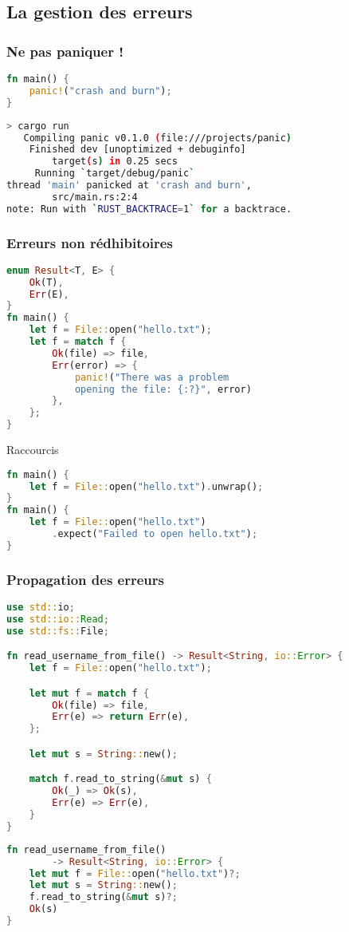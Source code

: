 \subsection{La gestion des erreurs}

\begin{frame}[fragile]
  \frametitle{Ne pas paniquer !}
  \begin{lstlisting}[language=rust]
fn main() {
    panic!("crash and burn");
}
  \end{lstlisting}
  \begin{lstlisting}[language=bash, basicstyle=\small{}]
> cargo run
   Compiling panic v0.1.0 (file:///projects/panic)
    Finished dev [unoptimized + debuginfo]
        target(s) in 0.25 secs
     Running `target/debug/panic`
thread 'main' panicked at 'crash and burn',
        src/main.rs:2:4
note: Run with `RUST_BACKTRACE=1` for a backtrace.
  \end{lstlisting}
\end{frame}

\begin{frame}[fragile]
  \frametitle{Erreurs non rédhibitoires}
  \begin{lstlisting}[language=rust, basicstyle=\small{}]
enum Result<T, E> {
    Ok(T),
    Err(E),
}
fn main() {
    let f = File::open("hello.txt");
    let f = match f {
        Ok(file) => file,
        Err(error) => {
            panic!("There was a problem
            opening the file: {:?}", error)
        },
    };
}
  \end{lstlisting}
\end{frame}

\begin{frame}[fragile]
  Raccourcis
  \begin{lstlisting}[language=rust]
fn main() {
    let f = File::open("hello.txt").unwrap();
}
fn main() {
    let f = File::open("hello.txt")
        .expect("Failed to open hello.txt");
}
  \end{lstlisting}
\end{frame}

\begin{frame}[fragile]
  \frametitle{Propagation des erreurs}
  \begin{lstlisting}[language=rust, basicstyle=\tiny{}]
use std::io;
use std::io::Read;
use std::fs::File;

fn read_username_from_file() -> Result<String, io::Error> {
    let f = File::open("hello.txt");

    let mut f = match f {
        Ok(file) => file,
        Err(e) => return Err(e),
    };

    let mut s = String::new();

    match f.read_to_string(&mut s) {
        Ok(_) => Ok(s),
        Err(e) => Err(e),
    }
}
  \end{lstlisting}
\end{frame}

\begin{frame}[fragile]
  \begin{lstlisting}[language=rust]
fn read_username_from_file()
        -> Result<String, io::Error> {
    let mut f = File::open("hello.txt")?;
    let mut s = String::new();
    f.read_to_string(&mut s)?;
    Ok(s)
}
  \end{lstlisting}
\end{frame}
